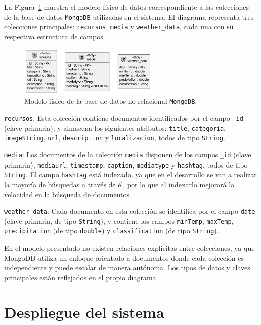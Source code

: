 La Figura~\ref{fig:modelo_datos_mongodb} muestra el modelo físico de datos correspondiente a las colecciones de la base de datos \texttt{MongoDB} utilizadas en el sistema. El diagrama representa tres colecciones principales: \texttt{recursos}, \texttt{media} y \texttt{weather\_data}, cada una con su respectiva estructura de campos.

\begin{figure}[h!tb]
\centering
\includegraphics[width=0.6\textwidth]{figs/mongo_fisico.pdf}
\caption{Modelo físico de la base de datos no relacional \texttt{MongoDB}.\label{fig:modelo_datos_mongodb}}
\end{figure}


\texttt{recursos}: Esta colección contiene documentos identificados por el campo \texttt{\_id} (clave primaria), y almacena los siguientes atributos: \texttt{title}, \texttt{categoria}, \texttt{imageString}, \texttt{url}, \texttt{description} y \texttt{localizacion}, todos de tipo \texttt{String}.

\texttt{media}: Los documentos de la colección \texttt{media} disponen de los campos \texttt{\_id} (clave primaria), \texttt{mediaurl}, \texttt{timestamp}, \texttt{caption}, \texttt{mediatype} y \texttt{hashtag}, todos de tipo \texttt{String}. El campo \texttt{hashtag} está indexado, ya que en el desarrollo se van a realizar la mayoría de búsquedas a través de él, por lo que al indexarlo mejorará la velocidad en la búsqueda de documentos.

\texttt{weather\_data}: Cada documento en esta colección se identifica por el campo \texttt{date} (clave primaria, de tipo \texttt{String}), y contiene los campos \texttt{minTemp}, \texttt{maxTemp}, \texttt{precipitation} (de tipo \texttt{double}) y \texttt{classification} (de tipo \texttt{String}).

En el modelo presentado no existen relaciones explícitas entre colecciones, ya que MongoDB utiliza un enfoque orientado a documentos donde cada colección es independiente y puede escalar de manera autónoma. Los tipos de datos y claves principales están reflejados en el propio diagrama.

\section{Despliegue del sistema}\label{ch:despliegue}


